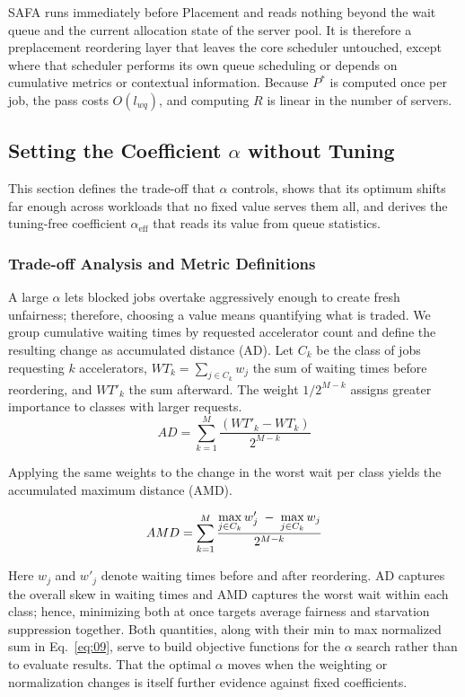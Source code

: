 \documentclass{ieeetj}
\begin{document}
SAFA runs immediately before Placement and reads nothing beyond the wait queue and the current allocation state of the server pool. It is therefore a preplacement reordering layer that leaves the core scheduler untouched, except where that scheduler performs its own queue scheduling or depends on cumulative metrics or contextual information. Because $P^*$ is computed once per job, the pass costs $O(l_{wq})$, and computing $R$ is linear in the number of servers.

\subsection{Setting the Coefficient $\alpha$ without Tuning}\label{sec:coeff}
This section defines the trade-off that $\alpha$ controls, shows that its optimum shifts far enough across workloads that no fixed value serves them all, and derives the tuning-free coefficient $\alpha_{\text{eff}}$ that reads its value from queue statistics.

\subsubsection{Trade-off Analysis and Metric Definitions}
A large $\alpha$ lets blocked jobs overtake aggressively enough to create fresh unfairness; therefore, choosing a value means quantifying what is traded. We group cumulative waiting times by requested accelerator count and define the resulting change as accumulated distance (AD). Let $C_k$ be the class of jobs requesting $k$ accelerators, $WT_k=\sum_{j\in C_k} w_j$ the sum of waiting times before reordering, and $WT'_k$ the sum afterward. The weight $1/2^{M-k}$ assigns greater importance to classes with larger requests.
\begin{equation}
AD = \sum_{k=1}^{M} \frac{(WT'_k - WT_k)}{2^{M-k}}
\label{eq:07}
\end{equation}

Applying the same weights to the change in the worst wait per class yields the accumulated maximum distance (AMD).

\begin{equation}
AMD = \sum_{k=1}^{M} \frac{\max\limits_{j\in C_k} w'_j \;-\; \max\limits_{j\in C_k} w_j}{2^{M-k}}
\label{eq:08}
\vspace{2pt}
\end{equation}

Here $w_j$ and $w'_j$ denote waiting times before and after reordering. AD captures the overall skew in waiting times and AMD captures the worst wait within each class; hence, minimizing both at once targets average fairness and starvation suppression together. Both quantities, along with their min to max normalized sum in Eq.~\eqref{eq:09}, serve to build objective functions for the $\alpha$ search rather than to evaluate results. That the optimal $\alpha$ moves when the weighting or normalization changes is itself further evidence against fixed coefficients.
\end{document}
